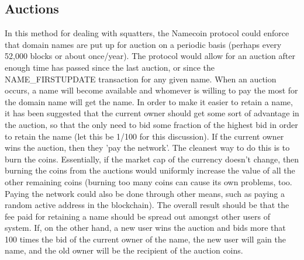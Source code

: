 \subsection{Auctions}
    In this method for dealing with squatters, the Namecoin protocol could enforce that domain names are put up for auction on a periodic basis (perhaps every 52,000 blocks or about once/year). The protocol would allow for an auction after enough time has passed since the last auction, or since the NAME\_FIRSTUPDATE transaction for any given name. When an auction occurs, a name will become available and whomever is willing to pay the most for the domain name will get the name. In order to make it easier to retain a name, it has been suggested that the current owner should get some sort of advantage in the auction, so that the only need to bid some fraction of the highest bid in order to retain the name (let this be 1/100 for this discussion). If the current owner wins the auction, then they 'pay the network'. The cleanest way to do this is to burn the coins. Essentially, if the market cap of the currency doesn't change, then burning the coins from the auctions would uniformly increase the value of all the other remaining coins (burning too many coins can cause its own problems, too. Paying the network could also be done through other means, such as paying a random active address in the blockchain). The overall result should be that the fee paid for retaining a name should be spread out amongst other users of system. If, on the other hand, a new user wins the auction and bids more that 100 times the bid of the current owner of the name, the new user will gain the name, and the old owner will be the recipient of the auction coins. 
